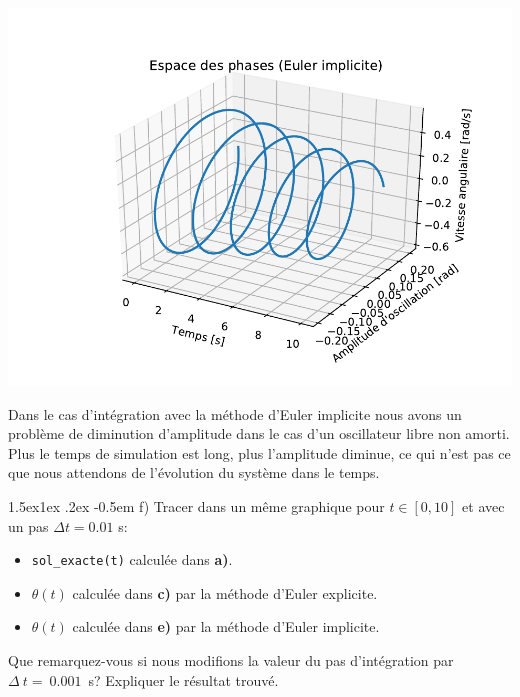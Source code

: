 \documentclass[%
oneside,                 %
final,                   %
10pt,french]{article}
\makeatletter
\newenvironment{blockshaded}
{\def\FrameCommand{\fboxsep=3mm\colorbox{grayicon_block_background}}
 \MakeFramed {\advance\hsize-\width \FrameRestore}}{\endMakeFramed}
\newenvironment{block_grayiconadmon}[1][Block]{
\begin{blockshaded}
\noindent
 \textbf{#1}\par
\nobreak\noindent\ignorespaces
}
{
\end{blockshaded}
}
\newenvironment{doconceexercise}{}{}
\newcommand\subex{\@startsection{paragraph}{4}{\z@}%
                  {1.5ex\@plus1ex \@minus.2ex}%
                  {-0.5em}%
                  {\normalfont\normalsize\bfseries}}
\makeatother
\begin{document}
\begin{doconceexercise}
\centerline{\includegraphics[width=1.0\linewidth]{scripts/Pendule_Eulerimp3D.pdf}}

\vspace{6mm}




\begin{block_grayiconadmon}[Remarque]
Dans le cas d'intégration avec la méthode d'Euler implicite nous avons un problème de diminution d’amplitude dans le cas d’un oscillateur libre non amorti. Plus le temps de simulation est long, plus l'amplitude diminue, ce qui n'est pas ce que nous attendons de l'évolution du système dans le temps.
\end{block_grayiconadmon} %




\subex{f)}
Tracer dans un même graphique pour $t \in [0, 10]$ et avec un pas $\Delta t = 0.01$ s:
\begin{itemize}
\item \Verb!sol_exacte(t)! calculée dans \textbf{a)}.

\item $\theta (t)$ calculée dans \textbf{c)} par la méthode d'Euler explicite.

\item $\theta (t)$ calculée dans \textbf{e)} par la méthode d'Euler implicite.
\end{itemize}

\noindent
Que remarquez-vous si nous modifions la valeur du pas d’intégration par $\Delta~t =~0.001$~s? Expliquer le résultat trouvé.



\end{doconceexercise}
\end{document}
